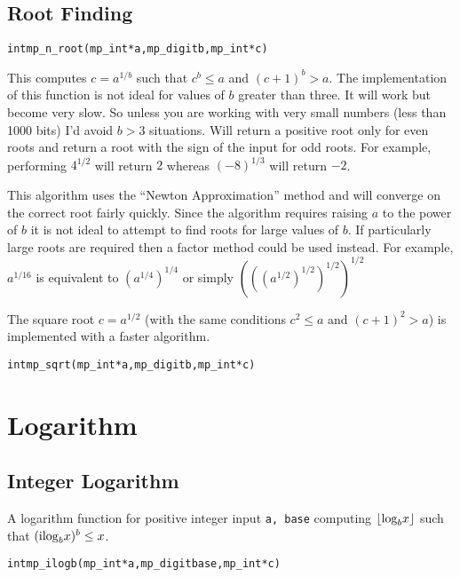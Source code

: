 \documentclass[synpaper]{book}
\def\log{{\rm log}}
\def\ilog{{\rm ilog}}
\newcommand{\floor}[1]{\left\lfloor{#1}\right\rfloor}
\begin{document}
\section{Root Finding}
\begin{alltt}
int mp_n_root (mp_int * a, mp_digit b, mp_int * c)
\end{alltt}
This computes $c = a^{1/b}$ such that $c^b \le a$ and $(c+1)^b > a$.  The implementation of this function is not
ideal for values of $b$ greater than three.  It will work but become very slow.  So unless you are working with very small
numbers (less than 1000 bits) I'd avoid $b > 3$ situations.  Will return a positive root only for even roots and return
a root with the sign of the input for odd roots.  For example, performing $4^{1/2}$ will return $2$ whereas $(-8)^{1/3}$
will return $-2$.

This algorithm uses the ``Newton Approximation'' method and will converge on the correct root fairly quickly.  Since
the algorithm requires raising $a$ to the power of $b$ it is not ideal to attempt to find roots for large
values of $b$.  If particularly large roots are required then a factor method could be used instead.  For example,
$a^{1/16}$ is equivalent to $\left (a^{1/4} \right)^{1/4}$ or simply
$\left ( \left ( \left ( a^{1/2} \right )^{1/2} \right )^{1/2} \right )^{1/2}$


The square root  $c = a^{1/2}$ (with the same conditions $c^2 \le a$ and $(c+1)^2 > a$) is implemented with a faster algorithm.

\begin{alltt}
int mp_sqrt (mp_int * a, mp_digit b, mp_int * c)
\end{alltt}

\chapter{Logarithm}
\section{Integer Logarithm}
A logarithm function for positive integer input \texttt{a, base} computing  $\floor{\log_bx}$ such that $(\ilog_bx)^b \le x$.
\begin{alltt}
int mp_ilogb(mp_int *a, mp_digit base, mp_int *c)
\end{alltt}
\end{document}
